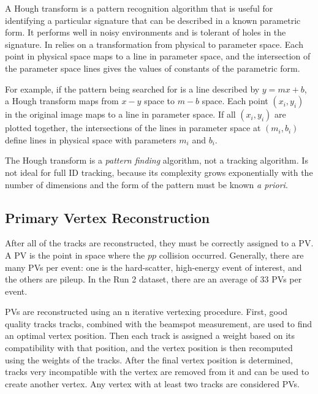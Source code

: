 
A Hough transform is a pattern recognition algorithm that is useful for identifying a particular signature that can be described in a known parametric form. It performs well in noisy environments and is tolerant of holes in the signature. In relies on a transformation from physical to parameter space. Each point in physical space maps to a line in parameter space, and the intersection of the parameter space lines gives the values of constants of the parametric form. 

For example, if the pattern being searched for is a line described by $y = mx + b$, a Hough transform maps from $x-y$ space to $m-b$ space. Each point $(x_i, y_i)$ in the original image maps to a line in parameter space. If all $(x_i, y_i)$ are plotted together, the intersections of the lines in parameter space at $(m_i, b_i)$ define lines in physical space with parameters $m_i$ and $b_i$. \cite{hough-transform}

The Hough transform is a \emph{pattern finding} algorithm, not a tracking algorithm. Is not ideal for full \ac{ID} tracking, because its complexity grows exponentially with the number of dimensions and the form of the pattern must be known \emph{a priori}.



\subsection{Primary Vertex Reconstruction}

After all of the tracks are reconstructed, they must be correctly assigned to a \ac{PV}. A \ac{PV} is the point in space where the $pp$ collision occurred. Generally, there are many \ac{PV}s per event: one is the hard-scatter, high-energy event of interest, and the others are pileup. In the Run 2 dataset, there are an average of 33 \ac{PV}s per event.

\ac{PV}s are reconstructed using an n iterative vertexing procedure. First, good quality tracks tracks, combined with the beamspot measurement, are used to find an optimal vertex position. Then each track is assigned a weight based on its compatibility with that position, and the vertex position is then recomputed using the weights of the tracks. After the final vertex position is determined, tracks very incompatible with the vertex are removed from it and can be used to create another vertex. Any vertex with at least two tracks are considered \ac{PV}s.



